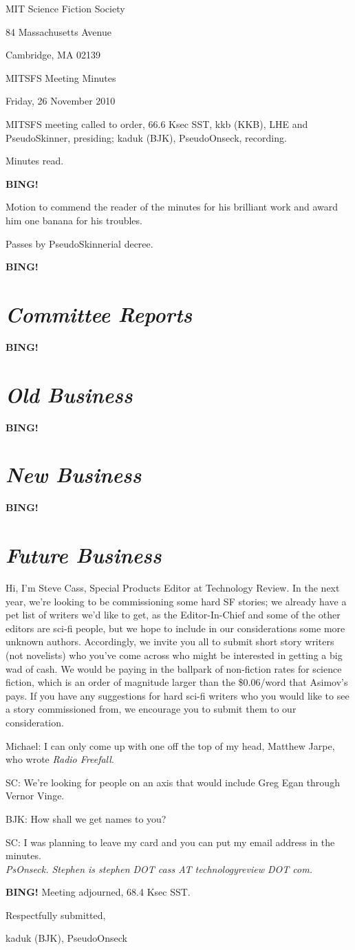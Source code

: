 \documentclass[10pt]{article}
\newcommand{\bing}{{\bf BING!} }
\newcommand{\goto}[1]{\bing \vskip 12pt \section*{{\em{#1}}}}
\newcommand{\skinner}{kkb (KKB), LHE and PseudoSkinner}
\newcommand{\onseck}{kaduk (BJK), PseudoOnseck}
\newcommand{\meetingdate}{Friday, 26 November 2010}
\begin{document}
\begin{center}

MIT Science Fiction Society

84 Massachusetts Avenue

Cambridge, MA 02139

\vspace{12pt}

MITSFS Meeting Minutes

\meetingdate

\end{center}

\vspace{18pt}

\setlength{\parskip}{6pt}

\noindent
MITSFS meeting called to order, 66.6 Ksec SST,
\skinner, presiding; \onseck, recording.

Minutes read.

\bing

Motion to commend the reader of the minutes for his brilliant work
and award him one banana for his troubles.

Passes by PseudoSkinnerial decree.

\goto{Committee Reports}

\goto{Old Business}

\goto{New Business}

\goto{Future Business}

Hi, I'm Steve Cass, Special Products Editor at Technology Review.
In the next year, we're looking to be commissioning some hard SF
stories; we already have a pet list of writers we'd like to get, as
the Editor-In-Chief and some of the other editors are sci-fi people,
but we hope to include in our considerations some more unknown authors.
Accordingly, we invite you all to submit short story writers (not
novelists) who you've come across who might be interested in getting
a big wad of cash.  We would be paying in the ballpark of non-fiction
rates for science fiction, which is an order of magnitude larger than
the \$0.06/word that Asimov's pays.  If you have any suggestions for
hard sci-fi writers who you would like to see a story commissioned
from, we encourage you to submit them to our consideration.

Michael: I can only come up with one off the top of my head,
Matthew Jarpe, who wrote {\em Radio Freefall}.

SC: We're looking for people on an axis that would include Greg Egan
through Vernor Vinge.

BJK: How shall we get names to you?

SC: I was planning to leave my card and you can put my email address
in the minutes.\\
{\em PsOnseck. Stephen is stephen DOT cass AT technologyreview DOT com.}

\bing
\noindent
Meeting adjourned, 68.4 Ksec SST.

\vspace{18pt}

\centerline{Respectfully submitted,}
\centerline{\onseck}
\end{document}
